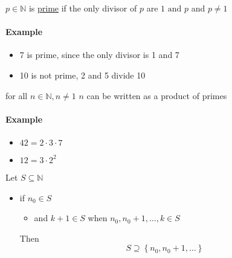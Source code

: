 \documentclass[11pt]{book}
\begin{document}
\begin{defn}[Prime]\label{defn:prime}
    $p \in \mathbb{N} $ is \underline{prime} if the only divisor of $p$ are $1 \text{ and } p$ and $p\neq 1$ 
\end{defn}

\paragraph{Example} 
\begin{itemize}
    \item 7 is prime, since the only divisor is 1 and 7
    \item 10 is not prime, 2 and 5 divide 10
\end{itemize}

\begin{thm}\label{thm:product_of_primes}
    for all $n \in \mathbb{N} ,n \neq 1$ $n$ can be written as a product of primes 
\end{thm}

\paragraph{Example} 
\begin{itemize}
    \item $42 = 2  \cdot 3 \cdot 7$ 
    \item $12 = 3  \cdot 2^{2} $ 
\end{itemize}

\newpage

\begin{defn}\label{defn:complete_induction}
    Let $S\subseteq \mathbb{N} $ 
    \begin{itemize}
        \item if $n_{0} \in S$ 
        \begin{itemize}
            \item and $k + 1 \in S$ when $n_{0} , n_{0}  + 1, \ldots , k \in S$ 
        \end{itemize}
        Then 
        \[
        S \supseteq \left\{ n_{0} , n_{0}  + 1, \ldots  \right\} 
        \]
    \end{itemize}
\end{defn}
\end{document}
